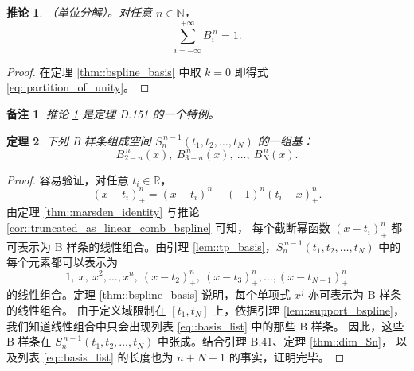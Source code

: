 \documentclass[a4paper]{ctexart}
\newtheorem{theorem}{定理}
\newtheorem{remark}{备注}
\newtheorem{corollary}[theorem]{推论}
\numberwithin{theorem}{section}
\numberwithin{equation}{section}
\numberwithin{figure}{section}
\numberwithin{remark}{section}
\begin{document}
\begin{corollary}
    \label{cor::partition_of_unity}
（单位分解）。对任意 $n\in\mathbb{N}$，
\begin{equation}
    \label{eq::partition_of_unity}
\sum_{i=-\infty}^{+\infty} B^{\,n}_i=1.
\end{equation}
\end{corollary}

\begin{proof}
在定理 \ref{thm::bspline_basis} 中取 $k=0$ 即得式 \eqref{eq::partition_of_unity}。
\end{proof}

\begin{remark}
    \label{rem::poU_special_case}
推论 \ref{cor::partition_of_unity} 是定理 D.151 的一个特例。
\end{remark}

\begin{theorem}
    \label{thm::basis_Sn-1}
下列 B 样条组成空间 $S^{\,n-1}_n(t_1,t_2,\ldots,t_N)$ 的一组基：
\begin{equation}
\label{eq::basis_list}
B^{\,n}_{2-n}(x),\ B^{\,n}_{3-n}(x),\ \ldots,\ B^{\,n}_{N}(x).
\end{equation}
\end{theorem}

\begin{proof}
容易验证，对任意 $t_i\in\mathbb{R}$，
\begin{equation}
\label{eq::trunc_identity}
(x-t_i)^{n}_{+}=(x-t_i)^{n}-(-1)^{n}(t_i-x)^{n}_{+}.
\end{equation}
由定理 \ref{thm::marsden_identity} 与推论 \ref{cor::truncated_as_linear_comb_bspline} 可知，
每个截断幂函数 $(x-t_i)^{n}_{+}$ 都可表示为 B 样条的线性组合。由引理 \ref{lem::tp_basis}，$S^{\,n-1}_n(t_1,t_2,\ldots,t_N)$ 中的每个元素都可以表示为
\[
1,\ x,\ x^{2},\ldots,x^{n},\ (x-t_2)^{n}_{+},\ (x-t_3)^{n}_{+},\ldots,(x-t_{N-1})^{n}_{+}
\]
的线性组合。定理 \ref{thm::bspline_basis} 说明，每个单项式 $x^{j}$ 亦可表示为 B 样条的线性组合。
由于定义域限制在 $[t_1,t_N]$ 上，依据引理 \ref{lem::support_bspline}，
我们知道线性组合中只会出现列表 \eqref{eq::basis_list} 中的那些 B 样条。
因此，这些 B 样条在 $S^{\,n-1}_n(t_1,t_2,\ldots,t_N)$ 中张成。结合引理 B.41、定理 \ref{thm::dim_Sn}，
以及列表 \eqref{eq::basis_list} 的长度也为 $n+N-1$ 的事实，证明完毕。 
\end{proof}
\end{document}
